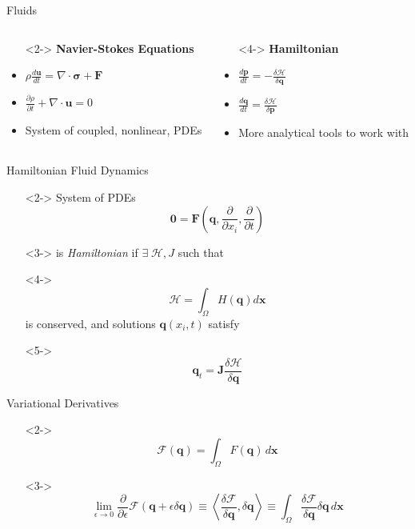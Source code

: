 \documentclass{beamer}
\begin{document}
		\begin{frame}[t]{Fluids}
			\begin{columns}
				\begin{column}{0.5\textwidth}
					\begin{itemize}
						\item[]<2-> \textbf{Navier-Stokes Equations}
						\item<3-> $\rho\frac{d \mathbf{u}}{dt} = \nabla\cdot\mathbf{\sigma} + \mathbf{F}$
						\item<3-> $\frac{\partial \rho}{\partial t} + \nabla\cdot\mathbf{u} = 0$
						\item<3-> System of coupled, nonlinear, PDEs
					\end{itemize}
				\end{column}
				\begin{column}{0.5\textwidth}
					\begin{itemize}
						\item[]<4-> \textbf{Hamiltonian}
						\item<5-> $\frac{d \mathbf{p}}{dt} = -\frac{\delta \mathcal{H}}{\delta \mathbf{q}}$
						\item<5-> $\frac{d \mathbf{q}}{dt} = \frac{\delta \mathcal{H}}{\delta \mathbf{p}}$
						\item<5-> More analytical tools to work with
					\end{itemize}
				\end{column}
			\end{columns}
		\end{frame}
		\begin{frame}[t]{Hamiltonian Fluid Dynamics}
			\begin{itemize}
				\item[]<2-> System of PDEs $$\mathbf{0} = \textbf{F}\left(\mathbf{q}, \frac{\partial}{\partial x_i}, \frac{\partial}{\partial t} \right)$$
				\item[]<3-> is \emph{Hamiltonian} if $\exists \; \mathcal{H}, J$ such that
				\item[]<4->$$\mathcal{H} = \int_\Omega H(\mathbf{q}) d\mathbf{x}$$ is conserved, and solutions $\mathbf{q}(x_i, t)$ satisfy
				\item[]<5-> $$\mathbf{q}_t = \mathbf{J}\frac{\delta \mathcal{H}}{\delta \mathbf{q}}$$
			\end{itemize}
		\end{frame}
		\begin{frame}[t]{Variational Derivatives}
			\begin{itemize}
				\item[]<2->$$ \mathcal{F}(\mathbf{q}) = \int_\Omega F(\mathbf{q}) \, d\mathbf{x} $$
				\item[]<3->$$ \lim_{\epsilon \rightarrow 0} \frac{\partial}{\partial \epsilon}\mathcal{F}(\mathbf{q} + \epsilon\delta\mathbf{q}) \equiv \left< \frac{\delta \mathcal{F}}{\delta \mathbf{q}}, \delta\mathbf{q} \right> \equiv \int_\Omega \frac{\delta \mathcal{F}}{\delta \mathbf{q}} \delta\mathbf{q} \, d\mathbf{x} $$
			\end{itemize}
		\end{frame}
\end{document}
